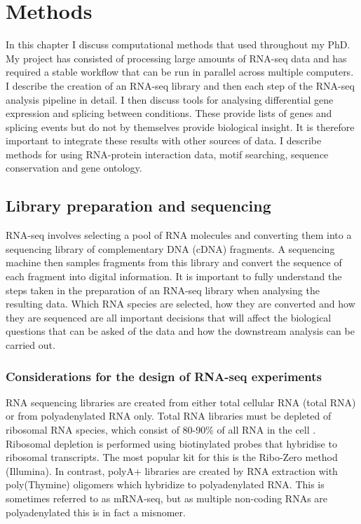 
\chapter{Methods}
\label{chapter:methods}

In this chapter I discuss computational methods that used throughout my PhD. 
My project has consisted of processing large amounts of RNA-seq data and has required a stable workflow that can be run in parallel across multiple computers.
I describe the creation of an RNA-seq library and then each step of the RNA-seq analysis pipeline in detail. 
I then discuss tools for analysing differential gene expression and splicing between conditions.
These provide lists of genes and splicing events but do not by themselves provide biological insight.
It is therefore important to integrate these results with other sources of data.
I describe methods for using RNA-protein interaction data, motif searching, sequence conservation and gene ontology.

\section{Library preparation and sequencing}

RNA-seq involves selecting a pool of RNA molecules and converting them into a sequencing library of complementary DNA (cDNA) fragments. A sequencing machine then samples fragments from this library and convert the sequence of each fragment into digital information. 
It is important to fully understand the steps taken in the preparation of an RNA-seq library when analysing the resulting data. 
Which RNA species are selected, how they are converted and how they are sequenced are all important decisions that will affect the biological questions that can be asked of the data and how the downstream analysis can be carried out.

\subsection{Considerations for the design of RNA-seq experiments}

RNA sequencing libraries are created from either total cellular RNA (total RNA) or from polyadenylated RNA only.
Total RNA libraries must be depleted of ribosomal RNA species, which consist of 80-90\% of all RNA in the cell \citep{Wilhelm2009}. 
Ribosomal depletion is performed using biotinylated probes that hybridise to ribosomal transcripts. The most popular kit for this is the Ribo-Zero method (Illumina).
In contrast, polyA+ libraries are created  by RNA extraction with poly(Thymine) oligomers which  hybridize to polyadenylated RNA. 
This is sometimes referred to as mRNA-seq, but as multiple non-coding RNAs are polyadenylated this is in fact a misnomer.

